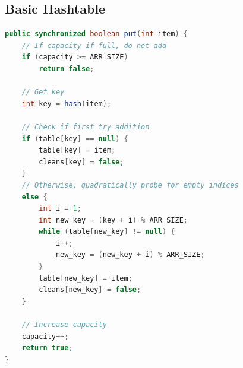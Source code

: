 \documentclass[conference]{IEEEtran}
\begin{document}
\subsection{Basic Hashtable}
\begin{lstlisting}[language={Java},caption=Source code for the course-grain put() method.,captionpos=b,breaklines=true,frame=single]
public synchronized boolean put(int item) {
    // If capacity if full, do not add
    if (capacity >= ARR_SIZE)
        return false;

    // Get key
    int key = hash(item);

    // Check if first try addition
    if (table[key] == null) {
        table[key] = item;
        cleans[key] = false;
    }
    // Otherwise, quadratically probe for empty indices
    else {
        int i = 1;
        int new_key = (key + i) % ARR_SIZE;
        while (table[new_key] != null) {
            i++;
            new_key = (new_key + i) % ARR_SIZE;
        }
        table[new_key] = item;
        cleans[new_key] = false;
    }

    // Increase capacity
    capacity++;
    return true;
}
\end{lstlisting}
\end{document}
